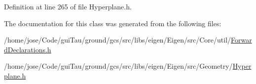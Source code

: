 Definition at line 265 of file Hyperplane.\-h.



The documentation for this class was generated from the following files\-:\begin{DoxyCompactItemize}
\item 
/home/jose/\-Code/gui\-Tau/ground/gcs/src/libs/eigen/\-Eigen/src/\-Core/util/\hyperlink{_forward_declarations_8h}{Forward\-Declarations.\-h}\item 
/home/jose/\-Code/gui\-Tau/ground/gcs/src/libs/eigen/\-Eigen/src/\-Geometry/\hyperlink{_hyperplane_8h}{Hyperplane.\-h}\end{DoxyCompactItemize}
